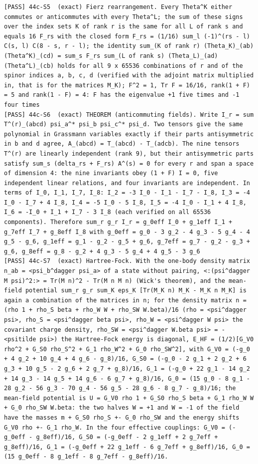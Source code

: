 \documentclass[
  10pt,
]{article}
\begin{document}
\begin{verbatim}
[PASS] 44c-S5  (exact) Fierz rearrangement. Every Theta^K either commutes or anticommutes with every Theta^L; the sum of these signs over the index sets K of rank r is the same for all L of rank s and equals 16 F_rs with the closed form F_rs = (1/16) sum_l (-1)^(rs - l) C(s, l) C(8 - s, r - l); the identity sum_(K of rank r) (Theta_K)_(ab) (Theta^K)_(cd) = sum_s F_rs sum_(L of rank s) (Theta_L)_(ad) (Theta^L)_(cb) holds for all 9 x 65536 combinations of r and of the spinor indices a, b, c, d (verified with the adjoint matrix multiplied in, that is for the matrices M_K); F^2 = 1, Tr F = 16/16, rank(1 + F) = 5 and rank(1 - F) = 4: F has the eigenvalue +1 five times and -1 four times
[PASS] 44c-S6  (exact) THEOREM (anticommuting fields). Write I_r = sum T^(r)_(abcd) psi_a^* psi_b psi_c^* psi_d. Two tensors give the same polynomial in Grassmann variables exactly if their parts antisymmetric in b and d agree, A_(abcd) = T_(abcd) - T_(adcb). The nine tensors T^(r) are linearly independent (rank 9), but their antisymmetric parts satisfy sum_s (delta_rs + F_rs) A^(s) = 0 for every r and span a space of dimension 4: the nine invariants obey (1 + F) I = 0, five independent linear relations, and four invariants are independent. In terms of I_0, I_1, I_7, I_8: I_2 = -3 I_0 - I_1 - I_7 - I_8, I_3 = -4 I_0 - I_7 + 4 I_8, I_4 = -5 I_0 - 5 I_8, I_5 = -4 I_0 - I_1 + 4 I_8, I_6 = -I_0 + I_1 + I_7 - 3 I_8 (each verified on all 65536 components). Therefore sum_r g_r I_r = g_0eff I_0 + g_1eff I_1 + g_7eff I_7 + g_8eff I_8 with g_0eff = g_0 - 3 g_2 - 4 g_3 - 5 g_4 - 4 g_5 - g_6, g_1eff = g_1 - g_2 - g_5 + g_6, g_7eff = g_7 - g_2 - g_3 + g_6, g_8eff = g_8 - g_2 + 4 g_3 - 5 g_4 + 4 g_5 - 3 g_6
[PASS] 44c-S7  (exact) Hartree-Fock. With the one-body density matrix n_ab = <psi_b^dagger psi_a> of a state without pairing, <:(psi^dagger M psi)^2:> = Tr(M n)^2 - Tr(M n M n) (Wick's theorem), and the mean-field potential sum_r g_r sum_K eps_K [Tr(M_K n) M_K - M_K n M_K] is again a combination of the matrices in n; for the density matrix n = (rho 1 + rho_S beta + rho_W W + rho_SW W.beta)/16 (rho = <psi^dagger psi>, rho_S = <psi^dagger beta psi>, rho_W = <psi^dagger W psi> the covariant charge density, rho_SW = <psi^dagger W.beta psi> = -<psitilde psi>) the Hartree-Fock energy is diagonal, E_HF = (1/2)[G_V0 rho^2 + G_S0 rho_S^2 + G_1 rho_W^2 + G_0 rho_SW^2], with G_V0 = (-g_0 + 4 g_2 + 10 g_4 + 4 g_6 - g_8)/16, G_S0 = (-g_0 - 2 g_1 + 2 g_2 + 6 g_3 + 10 g_5 - 2 g_6 + 2 g_7 + g_8)/16, G_1 = (-g_0 + 22 g_1 - 14 g_2 + 14 g_3 - 14 g_5 + 14 g_6 - 6 g_7 + g_8)/16, G_0 = (15 g_0 - 8 g_1 - 28 g_2 - 56 g_3 - 70 g_4 - 56 g_5 - 28 g_6 - 8 g_7 - g_8)/16; the mean-field potential is U = G_V0 rho 1 + G_S0 rho_S beta + G_1 rho_W W + G_0 rho_SW W.beta: the two halves W = +1 and W = -1 of the field have the masses m + G_S0 rho_S +- G_0 rho_SW and the energy shifts G_V0 rho +- G_1 rho_W. In the four effective couplings: G_V0 = (-g_0eff - g_8eff)/16, G_S0 = (-g_0eff - 2 g_1eff + 2 g_7eff + g_8eff)/16, G_1 = (-g_0eff + 22 g_1eff - 6 g_7eff + g_8eff)/16, G_0 = (15 g_0eff - 8 g_1eff - 8 g_7eff - g_8eff)/16.

\end{verbatim}
\end{document}

